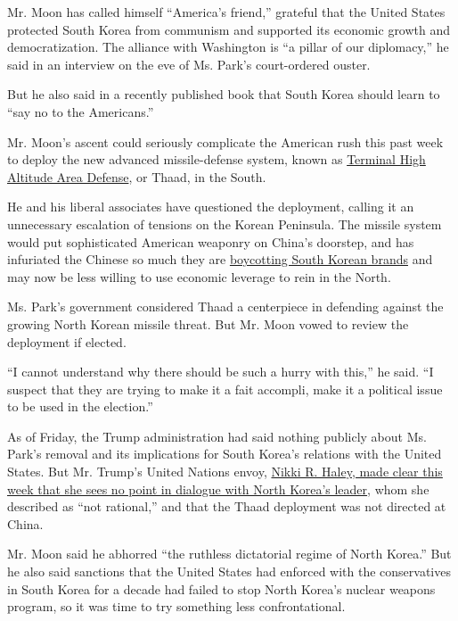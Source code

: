 Mr. Moon has called himself ``America's friend,'' grateful that the
United States protected South Korea from communism and supported its
economic growth and democratization. The alliance with Washington is ``a
pillar of our diplomacy,'' he said in an interview on the eve of Ms.
Park's court-ordered ouster.

But he also said in a recently published book that South Korea should
learn to ``say no to the Americans.''

Mr. Moon's ascent could seriously complicate the American rush this past
week to deploy the new advanced missile-defense system, known as
\href{https://www.mda.mil/system/thaad.html}{Terminal High Altitude Area
Defense}, or Thaad, in the South.

He and his liberal associates have questioned the deployment, calling it
an unnecessary escalation of tensions on the Korean Peninsula. The
missile system would put sophisticated American weaponry on China's
doorstep, and has infuriated the Chinese so much they are
\href{https://www.nytimes.com/2017/03/09/world/asia/china-lotte-thaad-south-korea.html}{boycotting
South Korean brands} and may now be less willing to use economic
leverage to rein in the North.

Ms. Park's government considered Thaad a centerpiece in defending
against the growing North Korean missile threat. But Mr. Moon vowed to
review the deployment if elected.

``I cannot understand why there should be such a hurry with this,'' he
said. ``I suspect that they are trying to make it a fait accompli, make
it a political issue to be used in the election.''

As of Friday, the Trump administration had said nothing publicly about
Ms. Park's removal and its implications for South Korea's relations with
the United States. But Mr. Trump's United Nations envoy,
\href{https://www.nytimes.com/2017/03/08/world/asia/china-north-korea-thaad-nuclear.html}{Nikki
R. Haley, made clear this week that she sees no point in dialogue with
North Korea's leader}, whom she described as ``not rational,'' and that
the Thaad deployment was not directed at China.

Mr. Moon said he abhorred ``the ruthless dictatorial regime of North
Korea.'' But he also said sanctions that the United States had enforced
with the conservatives in South Korea for a decade had failed to stop
North Korea's nuclear weapons program, so it was time to try something
less confrontational.

